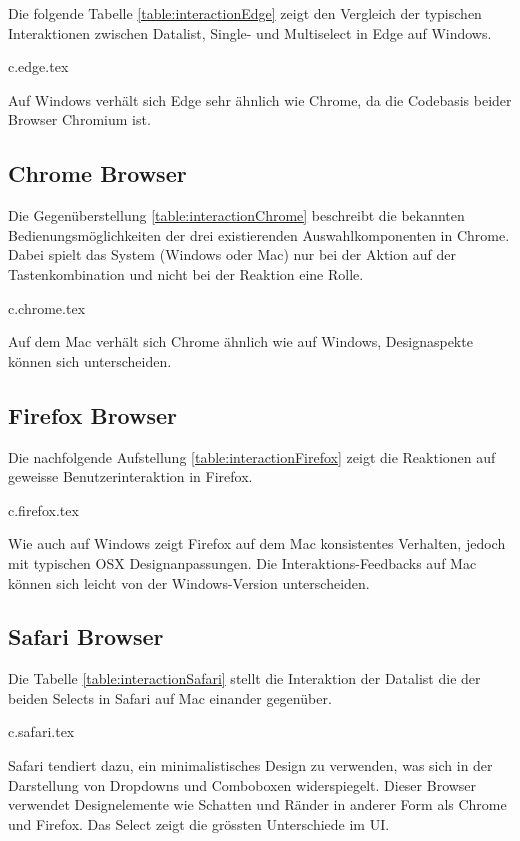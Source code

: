 Die folgende Tabelle \ref{table:interactionEdge} zeigt den Vergleich der typischen Interaktionen zwischen Datalist, Single- und Multiselect in Edge auf Windows.

{c.edge.tex}

Auf Windows verhält sich Edge sehr ähnlich wie Chrome, da die Codebasis beider Browser Chromium ist.


\clearpage
\subsection{Chrome Browser}
\label{sec:chromeBrowser}

Die Gegenüberstellung \ref{table:interactionChrome} beschreibt die bekannten Bedienungsmöglichkeiten der drei existierenden Auswahlkomponenten in Chrome.
Dabei spielt das System (Windows oder Mac) nur bei der Aktion auf der Tastenkombination und nicht bei der Reaktion eine Rolle.

{c.chrome.tex}

Auf dem Mac verhält sich Chrome ähnlich wie auf Windows, Designaspekte können sich unterscheiden. 


\clearpage
\subsection{Firefox Browser}
\label{sec:firefoxBrowser}

Die nachfolgende Aufstellung \ref{table:interactionFirefox} zeigt die Reaktionen auf geweisse Benutzerinteraktion in Firefox.

{c.firefox.tex}

Wie auch auf Windows zeigt Firefox auf dem Mac konsistentes Verhalten, jedoch mit typischen OSX Designanpassungen. 
Die Interaktions-Feedbacks auf Mac können sich leicht von der Windows-Version unterscheiden.


\clearpage
\subsection{Safari Browser}
\label{sec:safariBrowser}

Die Tabelle \ref{table:interactionSafari} stellt die Interaktion der Datalist die der beiden Selects in Safari auf Mac einander gegenüber.

{c.safari.tex}

Safari tendiert dazu, ein minimalistisches Design zu verwenden, was sich in der Darstellung von Dropdowns und Comboboxen widerspiegelt.
Dieser Browser verwendet Designelemente wie Schatten und Ränder in anderer Form als Chrome und Firefox.
Das Select zeigt die grössten Unterschiede im UI.


